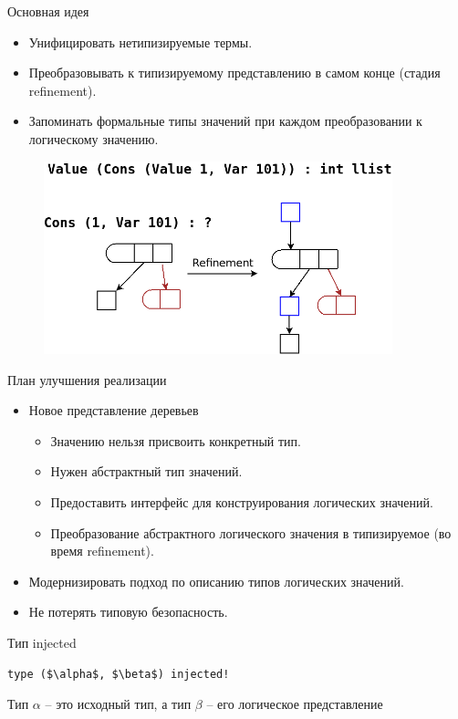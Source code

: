 \documentclass[10pt, mathserif]{beamer}
\theoremstyle{definition}
\begin{document}
\begin{frame}[fragile]{Основная идея}
\begin{itemize}
 \item Унифицировать нетипизируемые термы.
 \item Преобразовывать к типизируемому представлению в самом конце (стадия refinement).
 \item Запоминать формальные типы значений при каждом преобразовании к логическому значению.
\end{itemize}

\begin{figure}
\centering
\includegraphics[width=0.9\textwidth]{img5.png}
\end{figure}
\end{frame}

\begin{frame}[fragile]{План улучшения реализации}
  \begin{itemize}
  \item Новое представление деревьев
    \begin{itemize}
      \item Значению нельзя присвоить конкретный тип.
      \item Нужен абстрактный тип значений.
      \item Предоставить интерфейс для конструирования логических значений.
      \item Преобразование абстрактного логического значения в типизируемое (во время refinement).
    \end{itemize}
  \item Модернизировать подход по описанию типов логических значений.
  \item Не потерять типовую безопасность.
  \end{itemize}
\end{frame}

\begin{frame}[fragile]{Тип injected}
  \begin{lstlisting}[mathescape=true]
  type ($\alpha$, $\beta$) injected!
  \end{lstlisting}

\vskip 1cm
  Тип $\alpha$ -- это исходный тип, а тип $\beta$ -- его логическое представление
\end{frame}
\end{document}
